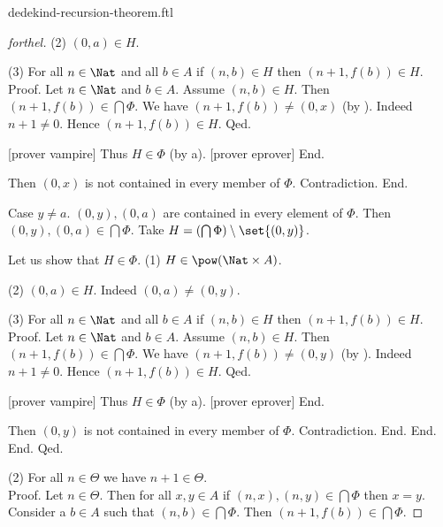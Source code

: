 \documentclass{naproche-library}
\begin{document}
\begin{smodule}{dedekind-recursion-theorem.ftl}
\begin{proof}[forthel]
                (2) $(0,a) \in H$.

                (3) For all $n \in \Nat$ and all $b \in A$ if
                $(n,b) \in H$ then $(n + 1, f(b)) \in H$. \\
                Proof.
                  Let $n \in \Nat$ and $b \in A$.
                  Assume $(n,b) \in H$.
                  Then $(n + 1, f(b)) \in \bigcap \Phi$.
                  We have $(n + 1, f(b)) \neq (0,x)$ (by ).
                  Indeed $n + 1 \neq 0$.
                  Hence $(n + 1, f(b)) \in H$.
                Qed.

                [prover vampire]
                Thus $H \in \Phi$ (by a).
                [prover eprover]
              End.

              Then $(0,x)$ is not contained in every member of $\Phi$.
              Contradiction.
            End.

            Case $y \neq a$.
              $(0,y), (0,a)$ are contained in every element of $\Phi$.
              Then $(0,y), (0,a) \in \bigcap \Phi$.
              Take $H = (\bigcap \Phi) \setminus \set{(0,y)}$.

              Let us show that $H \in \Phi$.
                (1) $H \in \pow(\Nat \times A)$.

                (2) $(0,a) \in H$.
                Indeed $(0,a) \neq (0,y)$.

                (3) For all $n \in \Nat$ and all $b \in A$ if
                $(n,b) \in H$ then $(n + 1, f(b)) \in H$. \\
                Proof.
                  Let $n \in \Nat$ and $b \in A$.
                  Assume $(n,b) \in H$.
                  Then $(n + 1, f(b)) \in \bigcap \Phi$.
                  We have $(n + 1, f(b)) \neq (0,y)$ (by ).
                  Indeed $n + 1 \neq 0$.
                  Hence $(n + 1, f(b)) \in H$.
                Qed.

                [prover vampire]
                Thus $H \in \Phi$ (by a).
                [prover eprover]
              End.

              Then $(0,y)$ is not contained in every member of $\Phi$.
              Contradiction.
            End.
          End.
        End.
      Qed.

      (2) For all $n \in \Theta$ we have $n + 1 \in \Theta$. \\
      Proof.
        Let $n \in \Theta$.
        Then for all $x, y \in A$ if $(n, x), (n, y) \in \bigcap \Phi$ then
        $x = y$.
        Consider a $b \in A$ such that $(n,b) \in \bigcap \Phi$.
        Then $(n + 1, f(b)) \in \bigcap \Phi$.


\end{proof}
\end{smodule}
\end{document}
